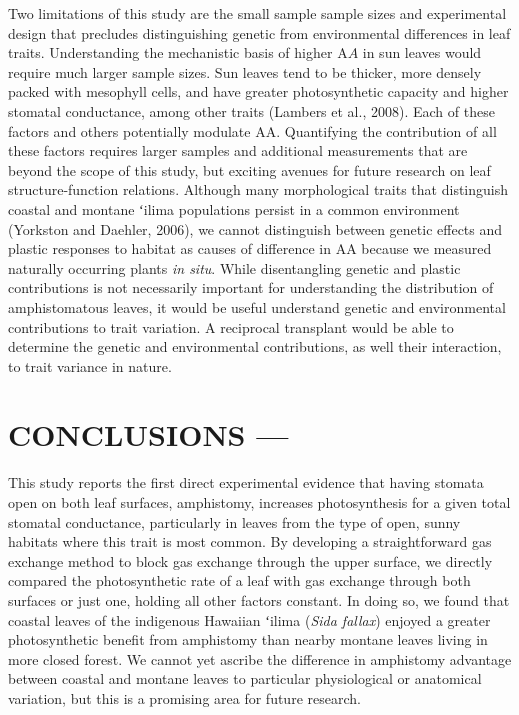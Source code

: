 \documentclass[
  letterpaper,
  DIV=11,
  numbers=noendperiod]{scrartcl}
\begin{document}
Two limitations of this study are the small sample sample sizes and
experimental design that precludes distinguishing genetic from
environmental differences in leaf traits. Understanding the mechanistic
basis of higher \(\mathrm{A}A\) in sun leaves would require much larger
sample sizes. Sun leaves tend to be thicker, more densely packed with
mesophyll cells, and have greater photosynthetic capacity and higher
stomatal conductance, among other traits (Lambers et al., 2008). Each of
these factors and others potentially modulate \(\mathrm{AA}\).
Quantifying the contribution of all these factors requires larger
samples and additional measurements that are beyond the scope of this
study, but exciting avenues for future research on leaf
structure-function relations. Although many morphological traits that
distinguish coastal and montane ʻilima populations persist in a common
environment (Yorkston and Daehler, 2006), we cannot distinguish between
genetic effects and plastic responses to habitat as causes of difference
in \(\mathrm{AA}\) because we measured naturally occurring plants
\emph{in situ}. While disentangling genetic and plastic contributions is
not necessarily important for understanding the distribution of
amphistomatous leaves, it would be useful understand genetic and
environmental contributions to trait variation. A reciprocal transplant
would be able to determine the genetic and environmental contributions,
as well their interaction, to trait variance in nature.

\hypertarget{conclusions}{%
\section{CONCLUSIONS ---}\label{conclusions}}

This study reports the first direct experimental evidence that having
stomata open on both leaf surfaces, amphistomy, increases photosynthesis
for a given total stomatal conductance, particularly in leaves from the
type of open, sunny habitats where this trait is most common. By
developing a straightforward gas exchange method to block gas exchange
through the upper surface, we directly compared the photosynthetic rate
of a leaf with gas exchange through both surfaces or just one, holding
all other factors constant. In doing so, we found that coastal leaves of
the indigenous Hawaiian ʻilima (\emph{Sida fallax}) enjoyed a greater
photosynthetic benefit from amphistomy than nearby montane leaves living
in more closed forest. We cannot yet ascribe the difference in
amphistomy advantage between coastal and montane leaves to particular
physiological or anatomical variation, but this is a promising area for
future research.
\end{document}
